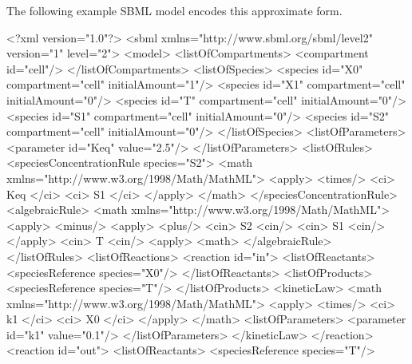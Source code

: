 \documentclass[10pt,twocolumntoc]{cekarticle}
\begin{document}
The following example SBML model encodes this approximate form.

\begin{example}
<?xml version="1.0"?>
<sbml xmlns="http://www.sbml.org/sbml/level2" version="1" level="2">
    <model>
        <listOfCompartments>
            <compartment id="cell"/>
        </listOfCompartments>
        <listOfSpecies>
            <species id="X0" compartment="cell" initialAmount="1"/>
            <species id="X1" compartment="cell" initialAmount="0"/>
            <species id="T" compartment="cell" initialAmount="0"/>
            <species id="S1" compartment="cell" initialAmount="0"/>
            <species id="S2" compartment="cell" initialAmount="0"/>
        </listOfSpecies>
        <listOfParameters>
            <parameter id="Keq" value="2.5"/>
        </listOfParameters>
        <listOfRules>
            <speciesConcentrationRule species="S2">
                <math xmlns="http://www.w3.org/1998/Math/MathML">
                    <apply>
                        <times/>
                        <ci> Keq </ci>
                        <ci> S1 </ci>
                    </apply>
                </math>
            </speciesConcentrationRule>
            <algebraicRule>
                <math xmlns="http://www.w3.org/1998/Math/MathML">
                    <apply>
                        <minus/>
                        <apply>
                            <plus/>
                            <cin> S2 <cin/>
                            <cin> S1 <cin/>
                        </apply>
                        <cin> T <cin/>
                    <apply>
                <math>
            </algebraicRule>
        </listOfRules>
        <listOfReactions>
            <reaction id="in">
                <listOfReactants>
                    <speciesReference species="X0"/>
                </listOfReactants>
                <listOfProducts>
                    <speciesReference species="T"/>
                </listOfProducts>
                <kineticLaw>
                    <math xmlns="http://www.w3.org/1998/Math/MathML">
                        <apply>
                            <times/>
                            <ci> k1 </ci>
                            <ci> X0 </ci>
                        </apply>
                    </math>
                    <listOfParameters>
                        <parameter id="k1" value="0.1"/>
                    </listOfParameters>
                </kineticLaw>
            </reaction>
            <reaction id="out">
                <listOfReactants>
                    <speciesReference species="T"/>

\end{example}
\end{document}
